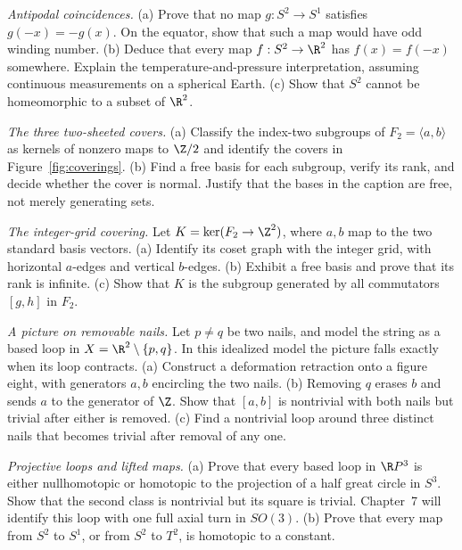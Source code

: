 \begin{exercise}[$\star\star$]\label{ex:borsukulam2}
\emph{Antipodal coincidences.} (a) Prove that no map $g:S^2\to S^1$ satisfies $g(-x)=-g(x)$. On the equator, show that such a map would have odd winding number. (b) Deduce that every map $f:S^2\to\R^2$ has $f(x)=f(-x)$ somewhere. Explain the temperature-and-pressure interpretation, assuming continuous measurements on a spherical Earth. (c) Show that $S^2$ cannot be homeomorphic to a subset of $\R^2$.
\end{exercise}

\begin{exercise}[$\star$]\label{ex:figureeight}
\emph{The three two-sheeted covers.} (a) Classify the index-two subgroups of $F_2=\langle a,b\rangle$ as kernels of nonzero maps to $\Z/2$ and identify the covers in Figure~\ref{fig:coverings}. (b) Find a free basis for each subgroup, verify its rank, and decide whether the cover is normal. Justify that the bases in the caption are free, not merely generating sets.
\end{exercise}

\begin{exercise}[$\star\star$]\label{ex:commutator}
\emph{The integer-grid covering.} Let $K=\ker(F_2\to\Z^2)$, where $a,b$ map to the two standard basis vectors. (a) Identify its coset graph with the integer grid, with horizontal $a$-edges and vertical $b$-edges. (b) Exhibit a free basis and prove that its rank is infinite. (c) Show that $K$ is the subgroup generated by all commutators $[g,h]$ in $F_2$.
\end{exercise}

\begin{exercise}[$\star\star$]\label{ex:picture}
\emph{A picture on removable nails.} Let $p\ne q$ be two nails, and model the string as a based loop in $X=\R^2\setminus\{p,q\}$. In this idealized model the picture falls exactly when its loop contracts. (a) Construct a deformation retraction onto a figure eight, with generators $a,b$ encircling the two nails. (b) Removing $q$ erases $b$ and sends $a$ to the generator of $\Z$. Show that $[a,b]$ is nontrivial with both nails but trivial after either is removed. (c) Find a nontrivial loop around three distinct nails that becomes trivial after removal of any one.
\end{exercise}

\begin{exercise}[$\star$]\label{ex:rp3}
\emph{Projective loops and lifted maps.} (a) Prove that every based loop in $\R P^3$ is either nullhomotopic or homotopic to the projection of a half great circle in $S^3$. Show that the second class is nontrivial but its square is trivial. Chapter~7 will identify this loop with one full axial turn in $SO(3)$. (b) Prove that every map from $S^2$ to $S^1$, or from $S^2$ to $T^2$, is homotopic to a constant.
\end{exercise}

